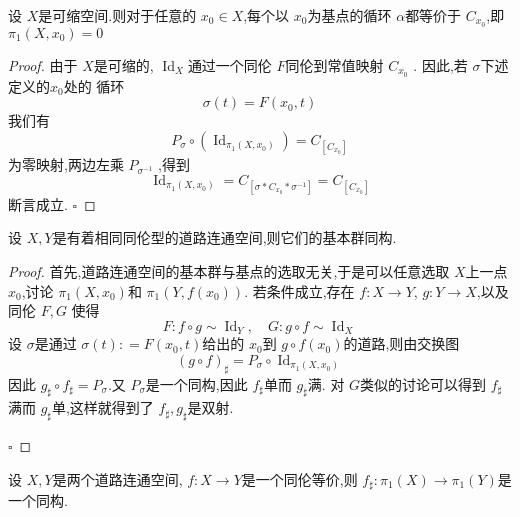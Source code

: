 \documentclass[../../几何与拓扑.tex]{subfiles}
\begin{document}
\begin{corollary}
    设 \(  X  \)是可缩空间.则对于任意的 \(  x_0 \in X  \),每个以 \(  x_0  \)为基点的循环 \(  \alpha   \)都等价于 \(  C_{x_0}  \),即\(  \pi _1 \left( X,x_0 \right)= 0   \)      
\end{corollary}

\begin{proof}

    由于 \(  X  \)是可缩的, \(  \operatorname{Id}_{X}  \)通过一个同伦 \(  F  \)同伦到常值映射 \(  C_{x_0}  \)    .
    因此,若 \(  \sigma   \)下述定义的\(  x_0  \)处的 循环 \[
    \sigma \left( t \right) =  F\left( x_0,t \right)  
    \] 我们有 \[
    P_{ \sigma }\circ \left( \operatorname{Id}_{\pi _1 \left( X,x_0 \right) } \right) = C_{[C_{x_0}]}  
    \]为零映射,两边左乘 \(  P_{ \sigma ^{-1} }  \) ,得到 \[
    \operatorname{Id}_{\pi _1 \left( X,x_0 \right) } =  C_{[ \sigma *C_{x_0}*  \sigma ^{-1} ]} =  C_{[C_{x_0}]}
    \] 断言成立.
    \hfill $\square$
\end{proof}

\begin{theorem}
    设 \(  X,Y  \)是有着相同同伦型的道路连通空间,则它们的基本群同构. 
\end{theorem}

\begin{proof}
    首先,道路连通空间的基本群与基点的选取无关,于是可以任意选取 \(  X  \)上一点 \(  x_0  \),讨论 \(  \pi _1 \left( X,x_0 \right)   \)和 \(  \pi _1 \left( Y,f\left( x_0 \right)  \right)   \).    
    若条件成立,存在 \(  f: X \to Y  \), \(  g:Y\to X  \),以及同伦 \(  F,G  \) 使得  \[
   F: f\circ g \sim \operatorname{Id}_{Y},\quad G: g\circ f \sim  \operatorname{Id}_{X}
    \]设 \(   \sigma   \)是通过 \(   \sigma \left( t \right): =  F\left( x_0,t \right)    \)给出的 \(  x_0  \)到 \(  g\circ f\left( x_0 \right)   \)的道路,则由交换图 \[
    \left( g\circ f \right)_{\sharp } =  P_{ \sigma }\circ \operatorname{Id}_{\pi _1 \left( X,x_0 \right) }
    \] 因此 \(  g_{\sharp }\circ f_{\sharp } =  P_{ \sigma }  \).又 \(  P_{ \sigma }  \)是一个同构,因此 \(  f_{\sharp }  \)单而 \(  g_{\sharp }  \)满. 对 \(  G  \)类似的讨论可以得到
     \(  f_{\sharp }  \)满而 \(  g_{\sharp }  \)单,这样就得到了 \(  f_{\sharp } ,g_{\sharp } \)是双射.           

    \hfill $\square$
\end{proof}

\begin{corollary}
    设 \(  X,Y  \)是两个道路连通空间, \(  f: X \to Y  \)是一个同伦等价,则 \(  f_{\sharp }: \pi _1 \left( X \right)\to \pi _1 \left( Y \right)    \)是一个同构.   
\end{corollary}
\end{document}
